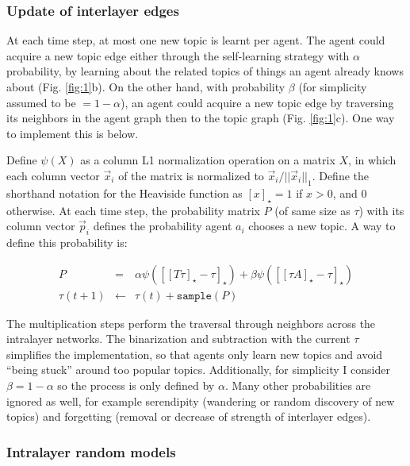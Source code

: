 \documentclass{svproc}
\begin{document}
\vspace{-1em}
\subsubsection*{Update of interlayer edges}

At each time step, at most one new topic is learnt per agent.
The agent could acquire a new topic edge either through the self-learning strategy with $\alpha$ probability, by learning about the related topics of things an agent already knows about (Fig. \ref{fig:1}b).
On the other hand, with probability $\beta$ (for simplicity assumed to be $=1 - \alpha$), an agent could acquire a new topic edge by traversing its neighbors in the agent graph then to the topic graph (Fig. \ref{fig:1}c).
One way to implement this is below.

Define $\psi(X)$ as a column L1 normalization operation on a matrix $X$, in which each column vector $\vec{x}_i$ of the matrix is normalized to $\vec{x}_i/||\vec{x}_i||_1$.
Define the shorthand notation for the Heaviside function as $[x]_{\star} = 1$ if $x > 0$, and $0$ otherwise.
At each time step, the probability matrix $P$ (of same size as $\tau$) with its column vector $\vec{p}_i$ defines the probability agent $a_i$ chooses a new topic. A way to define this probability is:

\vspace{-1em}
\begin{eqnarray}
    P &=&
    \alpha \psi\left(\left[\left[T\tau\right]_{\star} - \tau \right]_{\star}\right) +
    \beta \psi\left(\left[\left[\tau A\right]_{\star} - \tau \right]_{\star}\right)
    \label{eq:1}
    \\
    \tau(t+1) &\leftarrow& \tau(t) + \texttt{sample}(P)
    \label{eq:2}
\end{eqnarray}

The multiplication steps perform the traversal through neighbors across the intralayer networks.
The binarization and subtraction with the current $\tau$ simplifies the implementation, so that agents only learn new topics and avoid ``being stuck'' around too popular topics.
Additionally, for simplicity I consider $\beta = 1 - \alpha$ so the process is only defined by $\alpha$.
Many other probabilities are ignored as well, for example
    serendipity (wandering or random discovery of new topics)
    and forgetting (removal or decrease of strength of interlayer edges).

\vspace{-1em}
\subsubsection*{Intralayer random models}
\end{document}
